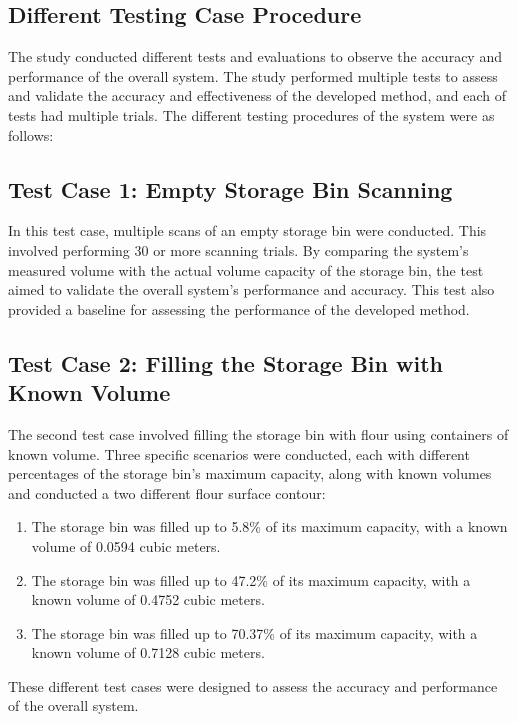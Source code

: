 \subsection{Different Testing Case Procedure}
\label{ch3:subsec:Different Testing Procedure}
The study conducted different tests and evaluations to observe the accuracy and performance of the overall system. The study performed multiple tests to assess and validate the accuracy and effectiveness of the developed method, and each of tests had multiple trials. The different testing procedures of the system were as follows:

\subsection*{Test Case 1: Empty Storage Bin Scanning}

In this test case, multiple scans of an empty storage bin were conducted. This involved performing 30 or more scanning trials. By comparing the system's measured volume with the actual volume capacity of the storage bin, the test aimed to validate the overall system's performance and accuracy. This test also provided a baseline for assessing the performance of the developed method.

\subsection*{Test Case 2: Filling the Storage Bin with Known Volume}
\label{ch3:subsec:test-case-2}

The second test case involved filling the storage bin with flour using containers of known volume. Three specific scenarios were conducted, each with different percentages of the storage bin's maximum capacity, along with known volumes and conducted a two different flour surface contour:

\begin{enumerate}
	\item The storage bin was filled up to 5.8\% of its maximum capacity, with a known volume of 0.0594 cubic meters.
	\item The storage bin was filled up to 47.2\% of its maximum capacity, with a known volume of 0.4752 cubic meters.
	\item The storage bin was filled up to 70.37\% of its maximum capacity, with a known volume of 0.7128 cubic meters.
\end{enumerate}

These different test cases were designed to assess the accuracy and performance of the overall system.


